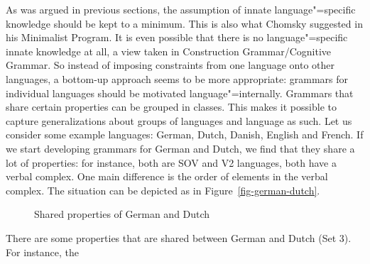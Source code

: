 As was argued in previous sections, the assumption of innate language"=specific knowledge should be
kept to a minimum. This is also what Chomsky suggested in his Minimalist Program. It is even possible
that there is no language"=specific innate knowledge at all, a view taken in Construction
Grammar/Cognitive Grammar. So instead of imposing constraints from one language onto other languages, a bottom-up approach seems
to be more appropriate: grammars for individual languages should be motivated language"=internally. Grammars that share certain properties can be grouped in classes. This makes it possible
to capture generalizations about groups of languages and language as such. Let us consider some
example languages: German, Dutch, Danish, English and French. If we start developing grammars for German and
Dutch, we find that they share a lot of properties: for instance, both are SOV and V2 languages, both have a
verbal complex. One main difference is the order of elements in the verbal complex. The situation
can be depicted as in Figure~\vref{fig-german-dutch}.
\begin{figure}
\centering
{}
\caption{\label{fig-german-dutch}Shared properties of German and Dutch}
\end{figure}%
There are some properties that are shared between German and Dutch (Set 3). For instance, the
